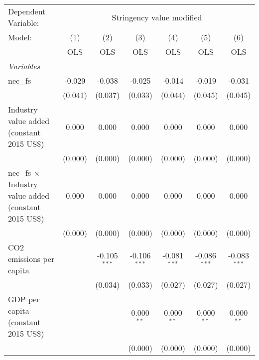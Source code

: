 
\begingroup
\centering
\begin{tabular}{lcccccc}
   \toprule
   Dependent Variable: & \multicolumn{6}{c}{Stringency value modified}\\
   Model:                                                        & (1)     & (2)            & (3)            & (4)            & (5)            & (6)\\  
                                                                 &  OLS    & OLS            & OLS            & OLS            & OLS            & OLS\\  
   \midrule
   \emph{Variables}\\
   nec\_fs                                                       & -0.029  & -0.038         & -0.025         & -0.014         & -0.019         & -0.031\\   
                                                                 & (0.041) & (0.037)        & (0.033)        & (0.044)        & (0.045)        & (0.045)\\   
   Industry value added (constant 2015 US\$)                     & 0.000   & 0.000          & 0.000          & 0.000          & 0.000          & 0.000\\   
                                                                 & (0.000) & (0.000)        & (0.000)        & (0.000)        & (0.000)        & (0.000)\\   
   nec\_fs $\times$ Industry value added (constant 2015 US\$)    & 0.000   & 0.000          & 0.000          & 0.000          & 0.000          & 0.000\\   
                                                                 & (0.000) & (0.000)        & (0.000)        & (0.000)        & (0.000)        & (0.000)\\   
   CO2 emissions per capita                                      &         & -0.105$^{***}$ & -0.106$^{***}$ & -0.081$^{***}$ & -0.086$^{***}$ & -0.083$^{***}$\\   
                                                                 &         & (0.034)        & (0.033)        & (0.027)        & (0.027)        & (0.027)\\   
   GDP per capita (constant 2015 US\$)                           &         &                & 0.000$^{**}$   & 0.000$^{**}$   & 0.000$^{**}$   & 0.000$^{**}$\\   
                                                                 &         &                & (0.000)        & (0.000)        & (0.000)        & (0.000)\\   

\end{tabular}
